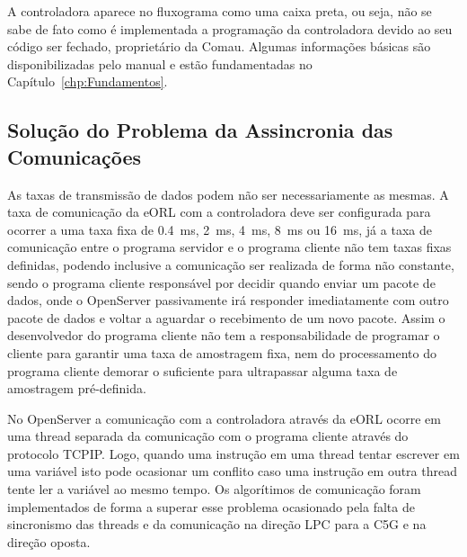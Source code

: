             A controladora aparece no fluxograma como uma caixa preta, ou seja, não se sabe de fato como é implementada a programação da controladora devido ao seu código ser fechado, proprietário da Comau. Algumas informações básicas são disponibilizadas pelo manual e estão fundamentadas no Capítulo~\ref{chp:Fundamentos}.
            
        \subsection{Solução do Problema da Assincronia das Comunicações}
        
            As taxas de transmissão de dados podem não ser necessariamente as mesmas. A taxa de comunicação da \ac{eORL} com a controladora deve ser configurada para ocorrer a uma taxa fixa de \SI{0,4}{\milli\second}, \SI{2}{\milli\second}, \SI{4}{\milli\second}, \SI{8}{\milli\second} ou \SI{16}{\milli\second}, já a taxa de comunicação entre o programa servidor e o programa cliente não tem taxas fixas definidas, podendo inclusive a comunicação ser realizada de forma não constante, sendo o programa cliente responsável por decidir quando enviar um pacote de dados, onde o OpenServer passivamente irá responder imediatamente com outro pacote de dados e voltar a aguardar o recebimento de um novo pacote. Assim o desenvolvedor do programa cliente não tem a responsabilidade de programar o cliente para garantir uma taxa de amostragem fixa, nem do processamento do programa cliente demorar o suficiente para ultrapassar alguma taxa de amostragem pré-definida.
            
            No OpenServer a comunicação com a controladora através da \ac{eORL} ocorre em uma thread separada da comunicação com o programa cliente através do protocolo \ac{TCPIP}. Logo, quando uma instrução em uma thread tentar escrever em uma variável isto pode ocasionar um conflito caso uma instrução em outra thread tente ler a variável ao mesmo tempo. Os algorítimos de comunicação foram implementados de forma a superar esse problema ocasionado pela falta de sincronismo das threads e da comunicação na direção LPC para a C5G e na direção oposta.
            
